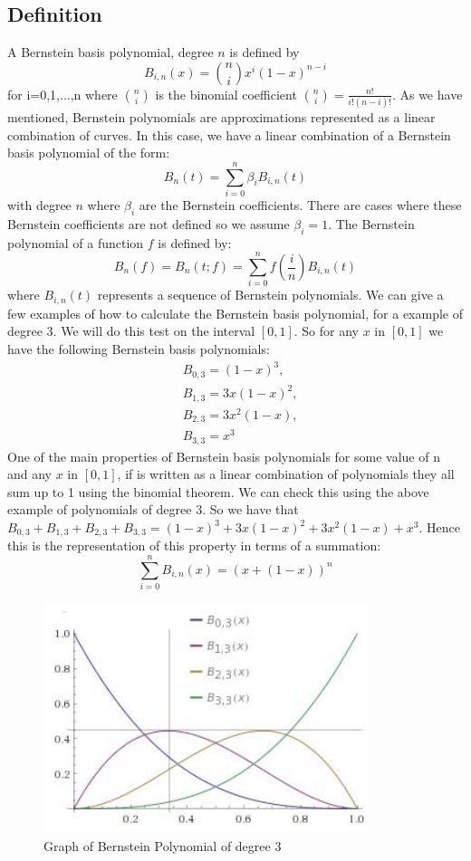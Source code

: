 \documentclass{article}
\begin{document}
\subsection{Definition}
A Bernstein basis polynomial, degree $n$ is defined by
\begin{equation}
 B_{i,n}(x)=\binom{n}{i}x^i(1-x)^{n-i} 
\end{equation}
for i=0,1,...,n where $\binom{n}{i}$ is the binomial coefficient $\binom{n}{i}=\frac{n!}{i!(n-i)!}$.
As we have mentioned, Bernstein polynomials are approximations represented as a linear combination of curves. In this case, we have a linear combination of a Bernstein basis polynomial of the form:
\begin{equation}
B_n(t)=\sum_{i=0}^{n}\beta_iB_{i,n}(t)
\end{equation}
with degree $n$ where $\beta_i$ are the Bernstein coefficients. There are cases where these Bernstein coefficients are not defined so we assume $\beta_i=1$. The Bernstein polynomial of a function $f$ is defined by:
\begin{equation}
B_n(f)=B_n(t;f)=\sum_{i=0}^nf(\frac{i}{n})B_{i,n}(t)   
\end{equation}
 where $B_{i,n}(t)$ represents a sequence of Bernstein polynomials.
We can give a few examples of how to calculate the Bernstein basis polynomial, for a example of degree $3$. We will do this test on the interval $[0,1]$. So for any $x$ in $[0,1]$ we have the following Bernstein basis polynomials:
\begin{align*}
 &B_{0,3}=(1-x)^3,\\   
&B_{1,3}=3x(1-x)^2,\\
&B_{2,3}=3x^2(1-x),\\
&B_{3,3}=x^3
\end{align*}
One of the main properties of Bernstein basis polynomials for some value of n and any $x$ in $[0,1]$, if is written as a linear combination of polynomials they all sum up to 1 using the binomial theorem. We can check this using the above example of polynomials of degree $3$. So we have that $B_{0,3}+B_{1,3}+B_{2,3}+B_{3,3}=(1-x)^3+3x(1-x)^2+3x^2(1-x)+x^3$.
Hence this is the representation of this property in terms of a summation:
\begin{equation}
\sum_{i=0}^nB_{i,n}(x)=(x+(1-x))^n    
\end{equation}
\begin{figure}[h]
    \centering
    \includegraphics[width=95mm]{BP.jpg}
    \caption{Graph of Bernstein Polynomial of degree $3$}
    \label{fig:2}
\end{figure}
\end{document}
